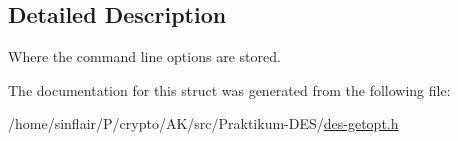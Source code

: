 \subsection{Detailed Description}
Where the command line options are stored. 

The documentation for this struct was generated from the following file\+:\begin{DoxyCompactItemize}
\item 
/home/sinflair/\+P/crypto/\+A\+K/src/\+Praktikum-\/\+D\+E\+S/\hyperlink{des-getopt_8h}{des-\/getopt.\+h}\end{DoxyCompactItemize}
